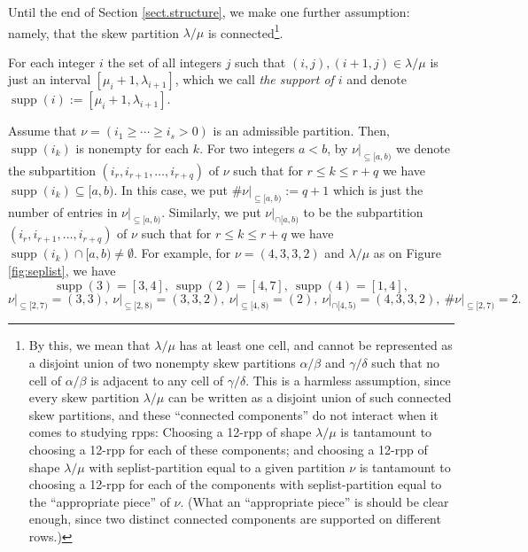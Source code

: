 \documentclass[numbers=enddot,12pt,final,onecolumn,notitlepage]{scrartcl}%
\theoremstyle{definition}
\def\seplistvar{{{\nu}}} %
\def\supp{{\operatorname*{supp}}}
\def\lm{{\lambda/\mu}}
\begin{document}
Until the end of Section \ref{sect.structure}, we make one further
assumption: namely, that the skew partition $\lm$ is
connected\footnote{By this, we mean that $\lm$ has at least one
cell, and cannot be represented
as a disjoint union of two nonempty skew partitions $\alpha/\beta$
and $\gamma/\delta$ such that no cell of $\alpha/\beta$ is adjacent
to any cell of $\gamma/\delta$. This is a harmless assumption,
since every skew partition $\lm$ can be written as a disjoint union
of such connected skew partitions, and these ``connected
components'' do not interact when it comes to studying rpps:
Choosing a 12-rpp of shape $\lm$ is tantamount to choosing
a 12-rpp for each of these components; and choosing a 12-rpp of
shape $\lm$ with seplist-partition equal to a given partition
$\seplistvar$ is tantamount to choosing a 12-rpp for each of the
components with seplist-partition equal to the ``appropriate piece''
of $\seplistvar$. (What an ``appropriate piece'' is should be
clear enough, since two distinct connected components are supported
on different rows.)}.

\newcommand{\nuxy}[2]{\seplistvar\big|_{\subseteq[#1,#2)}}
\newcommand{\nuxycap}[2]{\seplistvar\big|_{\cap[#1,#2)}}
\newcommand{\nupxy}[2]{\seplistvar^{\prime}\big|_{\subseteq[#1,#2)}}

\def\nuab{\nuxy{a}{b}}
\def\nuabcap{\nuxycap{a}{b}}



For each integer $i$ the set of all integers $j$ such that $(i,j),(i+1,j)\in\lm$ is just an interval $[\mu_{i}+1,\lambda_{i+1}]$, which we call \textit{the support of $i$} and denote $\supp(i):=[\mu_{i}+1,\lambda_{i+1}]$.

Assume that $\seplistvar = \left(i_1 \geq \cdots \geq i_s > 0\right)$ is an admissible partition. Then, $\supp(i_k)$ is nonempty for each $k$. For two integers $a< b$, by $\nuab$ we denote the subpartition $(i_r,i_{r+1},\dots,i_{r+q})$ of $\seplistvar$ such that for $r\leq k\leq r+q$ we have $\supp(i_k)\subseteq [a,b)$. In this case, we put $\#\nuab:=q+1$ which is just the number of entries in $\nuab$. Similarly, we put $\nuabcap$ to be the subpartition $(i_r,i_{r+1},\dots,i_{r+q})$ of $\seplistvar$ such that for $r\leq k\leq r+q$ we have $\supp(i_k)\cap [a,b)\neq\emptyset$.
For example, for $\seplistvar=(4,3,3,2)$ and $\lm$ as on Figure \ref{fig:seplist}, we have 
$$\supp(3)=[3,4],\ \supp(2)=[4,7],\ \supp(4)=[1,4],$$ 
$$\nuxy{2}{7}=(3,3),\ \nuxy{2}{8}=(3,3,2),\ \nuxy{4}{8}=(2),\ \nuxycap{4}{5}=(4,3,3,2),\ \#\nuxy{2}{7}=2.$$
\end{document}
